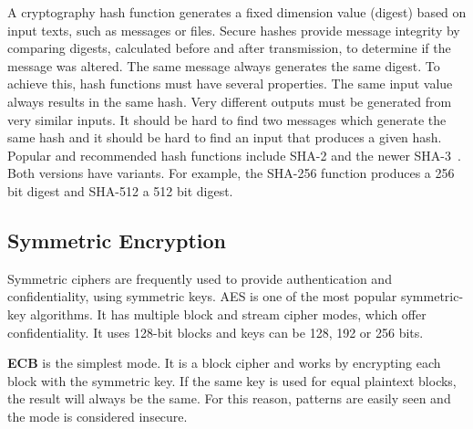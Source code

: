 A cryptography hash function generates a fixed dimension value (digest) based on input texts, such as messages or files. Secure hashes provide message integrity by comparing digests, calculated before and after transmission, to determine if the message was altered. The same message always generates the same digest.
To achieve this, hash functions must have several properties. The same input value always results in the same hash. Very different outputs must be generated from very similar inputs. It should be hard to find two messages which generate the same hash and it should be hard to find an input that produces a given hash.
Popular and recommended hash functions include \ac{SHA}-2 and the newer \ac{SHA}-3~\cite{dang2015secure}. Both versions have variants. For example, the \ac{SHA}-256 function produces a 256 bit digest and \ac{SHA}-512 a 512 bit digest.

\subsection{Symmetric Encryption}\label{chap:background:crypto:symmetric}

Symmetric ciphers are frequently used to provide authentication and confidentiality, using symmetric keys.
\ac{AES} is one of the most popular symmetric-key algorithms. It has multiple block and stream cipher modes, which offer confidentiality. It uses 128-bit blocks and keys can be 128, 192 or 256 bits.

\textbf{\ac{ECB}} is the simplest mode. It is a block cipher and works by encrypting each block with the symmetric key. If the same key is used for equal plaintext blocks, the result will always be the same. For this reason, patterns are easily seen and the mode is considered insecure.

